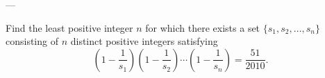 
---

    Find the least positive integer $n$ for which there exists a set $\{s_1,s_2,\ldots,s_n\}$ consisting of $n$ distinct positive integers satisfying \[\left(1-\frac1{s_1}\right)\left(1-\frac1{s_2}\right)\cdots\left(1-\frac1{s_n}\right)=\frac{51}{2010}.\]
